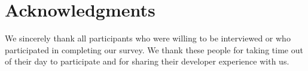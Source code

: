 \documentclass[conference]{IEEEtran}
\begin{document}
\section{Acknowledgments}

We sincerely thank all participants who were willing to be interviewed or who participated
in completing our survey. We thank these people for taking time out of their day to participate and for
sharing their developer experience with us.




\end{document}
